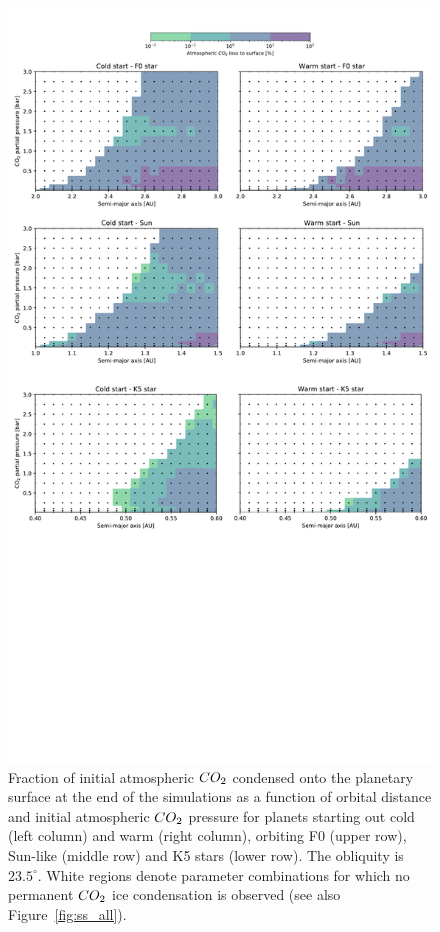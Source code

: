 \documentclass[fleqn,usenatbib]{mnras}
\begin{document}
\begin{figure}
	\includegraphics[width=\textwidth]{Figures/CO2_iceloss.pdf}
    \caption{Fraction of initial atmospheric $CO_{\rm 2}$ condensed onto the planetary surface at the end of the simulations as a function of orbital distance and initial atmospheric $CO_{\rm 2}$ pressure for planets starting out cold (left column) and warm (right column), orbiting F0 (upper row), Sun-like (middle row) and K5 stars (lower row). The obliquity is $23.5^{\circ}$. White regions denote parameter combinations for which no permanent $CO_{\rm 2}$ ice condensation is observed (see also Figure~\ref{fig:ss_all}).}
    \label{fig:CO2_iceloss}
\end{figure}
\end{document}
